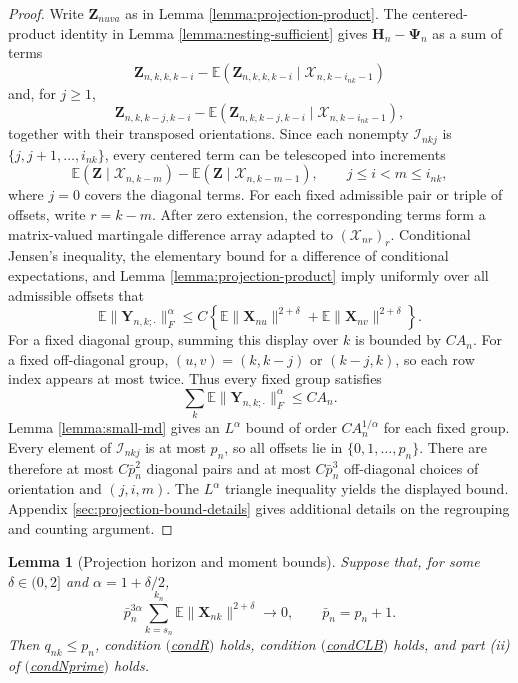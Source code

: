 \documentclass[11pt]{article}
\renewcommand\vec[1]{\boldsymbol{#1}}
\newcommand\mat[1]{\mathbf{#1}}
\newcommand{\E}{\mathbb{E}}
\newcommand{\X}{\mathcal{X}}
\newcommand{\I}{\mathcal{I}}
\newcommand{\refitem}[1]{$\mathrm{(}$\hyperlink{cond:#1}{\csname cond#1\endcsname}$\mathrm{)}$}
\newtheorem{lemma}{Lemma}
\theoremstyle{definition}
\begin{document}
\begin{proof}
Write \(\mat{Z}_{nuva}\) as in Lemma \ref{lemma:projection-product}.
The centered-product identity in Lemma \ref{lemma:nesting-sufficient} gives \(\mat{H}_n-\mat{\Psi}_n\) as a sum of terms
\[
\mat{Z}_{n,k,k,k-i}
-\E(\mat{Z}_{n,k,k,k-i}\mid\X_{n,k-i_{nk}-1})
\]
and, for \(j\geq1\),
\[
\mat{Z}_{n,k,k-j,k-i}
-\E(\mat{Z}_{n,k,k-j,k-i}\mid\X_{n,k-i_{nk}-1}),
\]
together with their transposed orientations.
Since each nonempty \(\I_{nkj}\) is \(\{j,j+1,\ldots,i_{nk}\}\), every centered term can be telescoped into increments
\[
\E(\mat{Z}\mid\X_{n,k-m})
-\E(\mat{Z}\mid\X_{n,k-m-1}),
\qquad j\leq i<m\leq i_{nk},
\]
where \(j=0\) covers the diagonal terms.
For each fixed admissible pair or triple of offsets, write \(r=k-m\).
After zero extension, the corresponding terms form a matrix-valued martingale difference array adapted to \((\X_{nr})_r\).
Conditional Jensen's inequality, the elementary bound for a difference of conditional expectations, and Lemma \ref{lemma:projection-product} imply uniformly over all admissible offsets that
\[
\E\|\mat{Y}_{n,k;\cdot}\|_F^\alpha
\leq
C\left\{
\E\|\vec{X}_{nu}\|^{2+\delta}
+
\E\|\vec{X}_{nv}\|^{2+\delta}
\right\}.
\]
For a fixed diagonal group, summing this display over \(k\) is bounded by \(CA_n\).
For a fixed off-diagonal group, \((u,v)=(k,k-j)\) or \((k-j,k)\), so each row index appears at most twice.
Thus every fixed group satisfies
\[
\sum_k\E\|\mat{Y}_{n,k;\cdot}\|_F^\alpha\leq CA_n.
\]
Lemma \ref{lemma:small-md} gives an \(L^\alpha\) bound of order \(CA_n^{1/\alpha}\) for each fixed group.
Every element of \(\I_{nkj}\) is at most \(p_n\), so all offsets lie in \(\{0,1,\ldots,p_n\}\).
There are therefore at most \(C\bar p_n^2\) diagonal pairs and at most \(C\bar p_n^3\) off-diagonal choices of orientation and \((j,i,m)\).
The \(L^\alpha\) triangle inequality yields the displayed bound.
Appendix \ref{sec:projection-bound-details} gives additional details on the regrouping and counting argument.
\end{proof}

\begin{lemma}[Projection horizon and moment bounds]\label{lemma:moment-conditions}
Suppose that, for some \(\delta\in(0,2]\) and \(\alpha=1+\delta/2\),
\[
\bar p_n^{3\alpha}
\sum_{k=s_n}^{k_n}\E\|\vec{X}_{nk}\|^{2+\delta}
\to0,
\qquad
\bar p_n=p_n+1.
\]
Then \(q_{nk}\leq p_n\), condition \refitem{R} holds, condition \refitem{CLB} holds, and part (ii) of \refitem{Nprime} holds.
\end{lemma}
\end{document}
